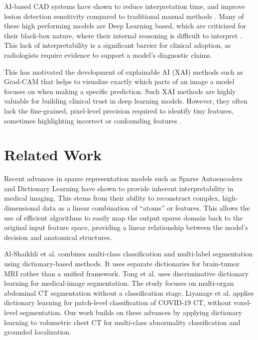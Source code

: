 \documentclass{article}
\begin{document}
AI-based CAD systems have shown to reduce interpretation time, and improve lesion detection sensitivity compared to traditional
manual methods \cite{doi2007computer}. Many of these high performing models are Deep Learning based, which are criticized for their black-box
nature, where their internal reasoning is difficult to interpret \cite{ennab2025advancing}. This lack of interpretability is a significant barrier
for clinical adoption, as radiologists require evidence to support a model's diagnostic claims.

This has motivated the development of explainable AI (XAI) methods such as Grad-CAM \cite{selvaraju2017grad}
that helps to visualize exactly which parts of an image a model focuses on when making a specific prediction.
Such XAI methods are highly valuable for building clinical trust in deep learning models. However, they often lack the
fine-grained, pixel-level precision required to identify tiny features, sometimes highlighting incorrect or confounding features \cite{ennab2025advancing}.

\section{Related Work}
\label{sec:related}

Recent advances in sparse representation models \cite{liyanage2022covid, wesp2026sparse} such as Sparse Autoencoders and Dictionary Learning
have shown to provide inherent interpretability in medical imaging. This stems from their ability to reconstruct complex,
high-dimensional data as a linear combination of “atoms” or features. This allows the use of efficient algorithms to easily
map the output sparse domain back to the original input feature space, providing a linear relationship between the model's
decision and anatomical structures.

Al-Shaikhli et al. \cite{alshaikhli2016brain} combines multi-class classification and multi-label segmentation using dictionary-based methods.
It uses separate dictionaries for brain-tumor MRI rather than a unified framework.
Tong et al. \cite{tong2015discriminative} uses discriminative dictionary learning for medical-image segmentation. The study focuses on
multi-organ abdominal CT segmentation without a classification stage.
Liyanage et al. \cite{liyanage2022covid} applies dictionary learning for patch-level classification of COVID-19 CT, without voxel-level segmentation.
Our work builds on these advances by applying dictionary learning to volumetric chest CT
for multi-class abnormality classification and grounded localization.
\end{document}
